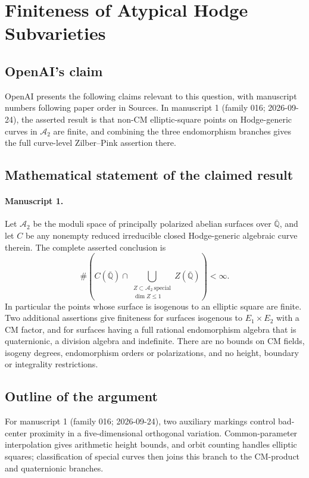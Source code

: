 \documentclass[11pt]{article}
\begin{document}
\section*{Finiteness of Atypical Hodge Subvarieties}

\subsection{OpenAI's claim}
OpenAI presents the following claims relevant to this question, with manuscript numbers following paper order in Sources. In manuscript 1 (family 016; 2026-09-24), the asserted result is that non-CM elliptic-square points on Hodge-generic curves in $\mathcal A_2$ are finite, and combining the three endomorphism branches gives the full curve-level Zilber--Pink assertion there.

\subsection{Mathematical statement of the claimed result}
\paragraph{Manuscript 1.}
Let $\mathcal A_2$ be the moduli space of principally polarized abelian surfaces over $\overline{\mathbb Q}$, and let $C$ be any nonempty reduced irreducible closed Hodge-generic algebraic curve therein. The complete asserted conclusion is
\[
 \#\left(C(\overline{\mathbb Q})\cap
 \bigcup_{\substack{Z\subset\mathcal A_2\ \mathrm{special}\\\dim Z\le1}}
 Z(\overline{\mathbb Q})\right)<\infty.
\]
In particular the points whose surface is isogenous to an elliptic square are finite. Two additional assertions give finiteness for surfaces isogenous to $E_1\times E_2$ with a CM factor, and for surfaces having a full rational endomorphism algebra that is quaternionic, a division algebra and indefinite. There are no bounds on CM fields, isogeny degrees, endomorphism orders or polarizations, and no height, boundary or integrality restrictions.

\subsection{Outline of the argument}
For manuscript 1 (family 016; 2026-09-24), two auxiliary markings control bad-center proximity in a five-dimensional orthogonal variation. Common-parameter interpolation gives arithmetic height bounds, and orbit counting handles elliptic squares; classification of special curves then joins this branch to the CM-product and quaternionic branches.
\end{document}
